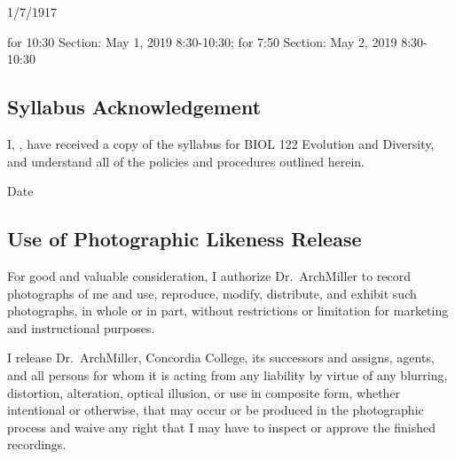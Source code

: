 \documentclass{tufte-handout}
\begin{document}
\begin{fullwidth}
\begin{calendar}{1/7/19}{17}




  \end{calendar}

 for 10:30 Section: May 1, 2019 8:30-10:30; for 7:50 Section: May 2, 2019 8:30-10:30

\end{fullwidth}



\newpage

\subsection{Syllabus Acknowledgement}

I, \underline{\hspace{5cm}}, have received a copy of the syllabus for BIOL 122 Evolution and Diversity, and understand all of the policies and procedures outlined herein. 

  \underline{\hspace{5cm}} {Date}  \hrulefill


\subsection{Use of Photographic Likeness Release}

For good and valuable consideration, I authorize Dr.~ArchMiller to record photographs of me and use, reproduce, modify, distribute, and exhibit such photographs, in whole or in part, without restrictions or limitation for marketing and instructional purposes. 

I release Dr.~ArchMiller, Concordia College, its successors and assigns, agents, and all persons for whom it is acting from any liability by virtue of any blurring, distortion, alteration, optical illusion, or use in composite form, whether intentional or otherwise, that may occur or be produced in the photographic process and waive any right that I may have to inspect or approve the finished recordings.
\end{document}
